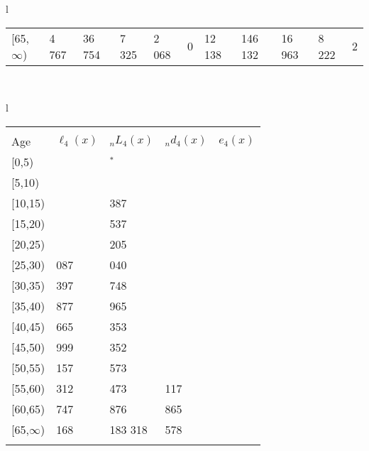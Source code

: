 \documentclass[
]{article}
\begin{document}
\begin{table}
\begin{tabular}[t]{l}
\begin{tabular}
{}[65,$\infty$) & 4 767 & 36 754 & 7 325 & 2 068 & 0 & 12 138 & 146 132 & 16 963 & 8 222 & 2\\
\end{tabular}\\
\end{tabular}
\centering
\begin{tabular}[t]{l}
\hline
\begin{tabular}{>{\raggedright\arraybackslash}p{.43in}>{\raggedleft\arraybackslash}p{1.3in}>{\raggedleft\arraybackslash}p{1.3in}>{\raggedleft\arraybackslash}p{1.3in}>{\raggedleft\arraybackslash}p{1.3in}}
\toprule
\multicolumn{1}{c}{ } & \multicolumn{4}{c}{(4) Lost both} \\
\cmidrule(l{3pt}r{3pt}){2-5}
Age & $\ell_{4}(x)$ & ${}_nL_{4}(x)$ & ${}_nd_{4}(x)$ & $e_{4}(x)$\\
\midrule
{}[0,5) & 0 & 225$^{*}$ & 0 & 21\\
{}[5,10) & 108 & 960 & 0 & 21\\
{}[10,15) & 251 & 1 387 & 0 & 21\\
{}[15,20) & 496 & 3 537 & 2 & 21\\
{}[20,25) & 968 & 7 205 & 7 & 21\\
\addlinespace
{}[25,30) & 2 087 & 14 040 & 18 & 21\\
{}[30,35) & 3 397 & 24 748 & 43 & 21\\
{}[35,40) & 5 877 & 39 965 & 96 & 21\\
{}[40,45) & 8 665 & 61 353 & 210 & 21\\
{}[45,50) & 13 999 & 97 352 & 452 & 20\\
\addlinespace
{}[50,55) & 20 157 & 148 573 & 996 & 20\\
{}[55,60) & 31 312 & 209 473 & 2 117 & 19\\
{}[60,65) & 39 747 & 257 876 & 3 865 & 17\\
{}[65,$\infty$) & 47 168 & 1 183 318 & 66 578 & 15\\
\bottomrule
\multicolumn{5}{l}{\rule{0pt}{1em}\textsuperscript{*} Based on an estimated from SIPP with less than 10 respondents in the numerator.}\\
\end{tabular}\\
\end{tabular}
\end{table}
\end{document}
